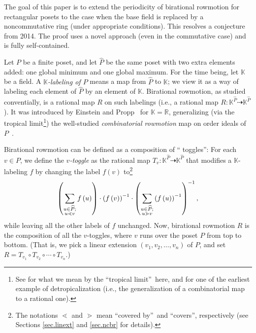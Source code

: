 \documentclass[numbers=enddot,12pt,final,onecolumn,notitlepage]{scrartcl}%
\theoremstyle{definition}
\let\sumnonlimits\sum
\renewcommand{\sum}{\sumnonlimits\limits}
\begin{document}
The goal of this paper is to extend the periodicity of birational rowmotion
for rectangular posets to the case when the base field is replaced by a
noncommutative ring (under appropriate conditions). This resolves a conjecture
from 2014. The proof uses a novel approach (even in the commutative case) and
is fully self-contained.

Let $P$ be a finite poset, and let $\widehat{P}$ be the same poset with two
extra elements added: one global minimum and one global maximum. For the time
being, let $\mathbb{K}$ be a field. A \emph{$\mathbb{K}$-labeling of $P$}
means a map from $\widehat{P}$ to $\mathbb{K}$; we view it as a way of
labeling each element of $\widehat{P}$ by an element of $\mathbb{K}$.
Birational rowmotion, as studied conventially, is a rational map $R$ on such
labelings (i.e., a rational map $R:\mathbb{K}^{\widehat{P}}\dashrightarrow
\mathbb{K}^{\widehat{P}}$). It was introduced by Einstein and
Propp~\cite{einstein-propp} for $\mathbb{K}=\mathbb{R}$, generalizing (via the
tropical limit\footnote{See \cite[Section 4.1]{kirillov-intro} for what we
mean by the \textquotedblleft tropical limit\textquotedblright\ here, and
\cite{kirillov-berenstein} for one of the earliest example of
detropicalization (i.e., the generalization of a combinatorial map to a
rational one).}) the well-studied \emph{combinatorial rowmotion} map on order
ideals of $P$~\cite{brouwer-schrijver,striker-williams,propp-roby,row-slow}.

Birational rowmotion can be defined as a composition of \textquotedblleft
toggles\textquotedblright: For each $v\in P$, we define the $v$\emph{-toggle}
as the rational map $T_{v}:\mathbb{K}^{\widehat{P}}\dashrightarrow
\mathbb{K}^{\widehat{P}}$ that modifies a $\mathbb{K}$-labeling $f$ by
changing the label $f\left(  v\right)  $ to\footnote{The notations $\lessdot$
and $\gtrdot$ mean \textquotedblleft covered by\textquotedblright\ and
\textquotedblleft covers\textquotedblright, respectively (see Sections
\ref{sec.linext} and \ref{sec.ncbr} for details).}%
\[
\left(  \sum\limits_{\substack{u\in\widehat{P};\\u\lessdot v}}f\left(
u\right)  \right)  \cdot\left(  f\left(  v\right)  \right)  ^{-1}\cdot\left(
\sum\limits_{\substack{u\in\widehat{P};\\u\gtrdot v}}\left(  f\left(
u\right)  \right)  ^{-1}\right)  ^{-1},
\]
while leaving all the other labels of $f$ unchanged. Now, birational rowmotion
$R$ is the composition of all the $v$-toggles, where $v$ runs over the poset
$P$ from top to bottom. (That is, we pick a linear extension $\left(
v_{1},v_{2},\ldots,v_{n}\right)  $ of $P$, and set $R=T_{v_{1}}\circ T_{v_{2}%
}\circ\cdots\circ T_{v_{n}}$.)
\end{document}
